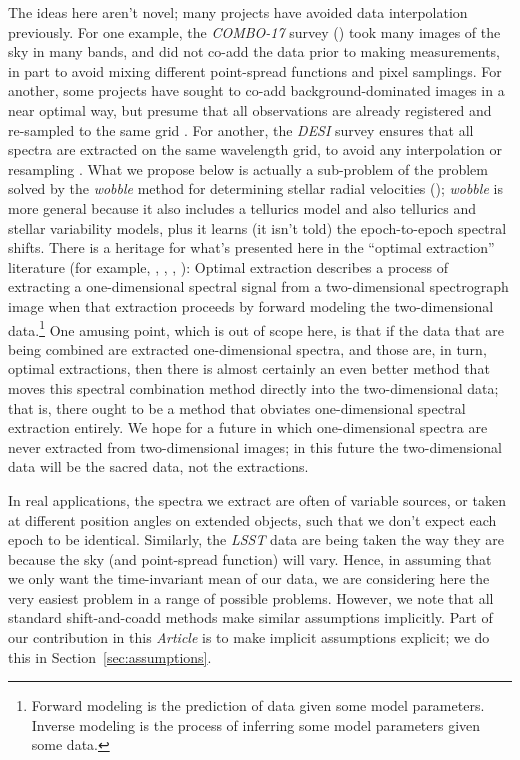 \documentclass[modern, linenumbers]{aastex631}
\newcommand{\documentname}{\textsl{Article}}
\newcommand{\sectionname}{Section}
\newcommand{\secref}[1]{\sectionname~\ref{#1}}
\begin{document}
The ideas here aren't novel; many projects have avoided data interpolation previously.
For one example, the \textsl{COMBO-17} survey (\citealt{combo17}) took many images of the sky in many bands, and did not co-add the data prior to making measurements, in part to avoid mixing different point-spread functions and pixel samplings.
For another, some projects have sought to co-add background-dominated images in a near optimal way, but presume that all observations are already registered and re-sampled to the same grid \citep{zackay}.
For another, the \textsl{DESI} survey ensures that all spectra are extracted on the same wavelength grid, to avoid any interpolation or resampling \citep{desipipeline}.
What we propose below is actually a sub-problem of the problem solved by the \textsl{wobble} method for determining stellar radial velocities (\citealt{wobble}); \textsl{wobble} is more general because it also includes a tellurics model and also tellurics and stellar variability models,
plus it learns (it isn't told) the epoch-to-epoch spectral shifts.
There is a heritage for what's presented here in the ``optimal extraction'' literature (for example, \citealt{oe}, \citealt{kelson}, \citealt{froe}, \citealt{sp}):
Optimal extraction describes a process of extracting a one-dimensional spectral signal from a two-dimensional spectrograph image when that extraction proceeds by forward modeling the two-dimensional data.\footnote{Forward modeling is the prediction of data given some model parameters. Inverse modeling is the process of inferring some model parameters given some data.}
One amusing point, which is out of scope here, is that if the data that are being combined are extracted one-dimensional spectra, and those are, in turn, optimal extractions, then there is almost certainly an even better method that moves this spectral combination method directly into the two-dimensional data; that is, there ought to be a method that obviates one-dimensional spectral extraction entirely.
We hope for a future in which one-dimensional spectra are never extracted from two-dimensional images; in this future the two-dimensional data will be the sacred data, not the extractions.

In real applications, the spectra we extract are often of variable sources, or taken at different position angles on extended objects, such that we don't expect each epoch to be identical.
Similarly, the \textsl{LSST} data are being taken the way they are because the sky (and point-spread function) will vary.
Hence, in assuming that we only want the time-invariant mean of our data, we are considering here the very easiest problem in a range of possible problems.
However, we note that all standard shift-and-coadd methods make similar assumptions implicitly.
Part of our contribution in this \documentname{} is to make implicit assumptions explicit; we do this in \secref{sec:assumptions}.
\end{document}
